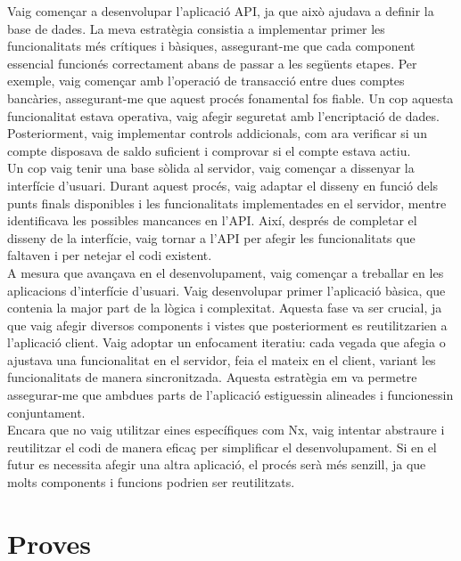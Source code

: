 \documentclass[a4paper,12pt,twoside]{ThesisStyle}
\begin{document}
Vaig començar a desenvolupar l'aplicació API, ja que això ajudava a definir la base de dades. La meva estratègia consistia a implementar primer les funcionalitats més crítiques i bàsiques, assegurant-me que cada component essencial funcionés correctament abans de passar a les següents etapes. Per exemple, vaig començar amb l'operació de transacció entre dues comptes bancàries, assegurant-me que aquest procés fonamental fos fiable. Un cop aquesta funcionalitat estava operativa, vaig afegir seguretat amb l'encriptació de dades. Posteriorment, vaig implementar controls addicionals, com ara verificar si un compte disposava de saldo suficient i comprovar si el compte estava actiu.\\

Un cop vaig tenir una base sòlida al servidor, vaig començar a dissenyar la interfície d'usuari. Durant aquest procés, vaig adaptar el disseny en funció dels punts finals disponibles i les funcionalitats implementades en el servidor, mentre identificava les possibles mancances en l'API. Així, després de completar el disseny de la interfície, vaig tornar a l'API per afegir les funcionalitats que faltaven i per netejar el codi existent.\\

A mesura que avançava en el desenvolupament, vaig començar a treballar en les aplicacions d'interfície d'usuari. Vaig desenvolupar primer l'aplicació bàsica, que contenia la major part de la lògica i complexitat. Aquesta fase va ser crucial, ja que vaig afegir diversos components i vistes que posteriorment es reutilitzarien a l'aplicació client. Vaig adoptar un enfocament iteratiu: cada vegada que afegia o ajustava una funcionalitat en el servidor, feia el mateix en el client, variant les funcionalitats de manera sincronitzada. Aquesta estratègia em va permetre assegurar-me que ambdues parts de l'aplicació estiguessin alineades i funcionessin conjuntament.\\

Encara que no vaig utilitzar eines específiques com Nx, vaig intentar abstraure i reutilitzar el codi de manera eficaç per simplificar el desenvolupament. Si en el futur es necessita afegir una altra aplicació, el procés serà més senzill, ja que molts components i funcions podrien ser reutilitzats.


\section{Proves}
\label{sec: Proves}
\end{document}
